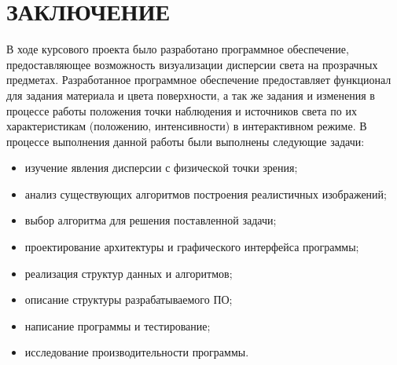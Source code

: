 \chapter*{ЗАКЛЮЧЕНИЕ}

    В ходе курсового проекта было разработано программное обеспечение, предоставляющее возможность визуализации дисперсии света на прозрачных предметах. Разработанное программное обеспечение предоставляет функционал для задания материала и цвета поверхности, а так же задания и изменения в процессе работы положения точки наблюдения и источников света по их характеристикам (положению, интенсивности) в интерактивном режиме. В процессе выполнения данной работы были выполнены следующие задачи:

    \begin{itemize}
        \item изучение явления дисперсии с физической точки зрения;
        \item анализ существующих алгоритмов построения реалистичных изображений;
        \item выбор алгоритма для решения поставленной задачи;
        \item проектирование архитектуры и графического интерфейса программы;
        \item реализация структур данных и алгоритмов;
	    \item описание структуры разрабатываемого ПО;
	    \item написание программы и тестирование;
        \item исследование производительности программы.
    \end{itemize}